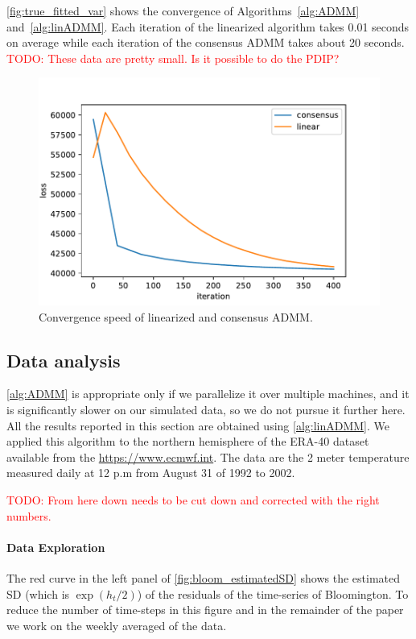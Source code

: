 \documentclass{article}
\newcommand{\attn}[1]{\textcolor{red}{TODO: #1}}
\begin{document}
\autoref{fig:true_fitted_var} shows the convergence
of Algorithms~\ref{alg:ADMM} and~\ref{alg:linADMM}. Each iteration of
the linearized algorithm 
takes 0.01 seconds on average while each iteration of the
consensus ADMM takes about 20 seconds.  \attn{These data are pretty
  small. Is it possible to do the PDIP?}
\begin{figure}[tb]
  \centering				
  \includegraphics[height=.15\textheight]{Figures/convergence}	
  \caption{Convergence speed of linearized and consensus
    ADMM.} \label{fig:true_fitted_var}  
\end{figure}

\subsection{Data analysis}

\autoref{alg:ADMM} is appropriate only if
we parallelize it over multiple machines, and it is significantly
slower on our simulated data, so we do not pursue it
further here. All the results reported in this section are obtained
using \autoref{alg:linADMM}. We
applied this algorithm to the northern hemisphere of the ERA-40
dataset available from the \href{European Center for Medium-Range
  Weather Forecasts}{https://www.ecmwf.int}. The data are
the 2 meter temperature measured daily at 12 p.m from August 31 of
1992 to 2002. 

\attn{From here down needs to be cut down and corrected with the right numbers.}

\paragraph{Data Exploration}
The red curve in the left panel of \autoref{fig:bloom_estimatedSD}
shows the estimated SD (which is $\exp(h_t/2)$) of the residuals of
the time-series of Bloomington. To reduce the number of time-steps in
this figure and in the remainder of the paper we work on the weekly
averaged of the data.  
\end{document}

